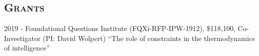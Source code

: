 \documentclass[margin,line,centered]{res}
\begin{document}
\begin{resume}











\section{\textsc{Grants}}
2019 - Foundational Questions Institute (FQXi-RFP-IPW-1912),  \$118,100, Co-Investigator (PI: David Wolpert)
``The role of constraints in the thermodynamics of intelligence'' 


\end{resume}
\end{document}
